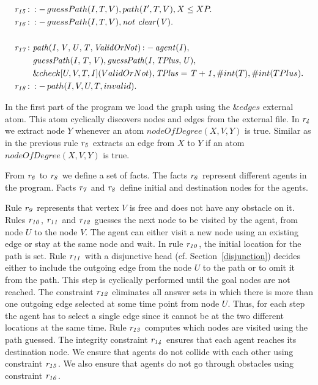\documentclass[a4paper, titlepage]{article}
\newcommand{\ext}[3]{\ensuremath{\&{#1}[#2](#3)}}
\DeclareMathOperator{\leftimpl}{:-}
\newcommand{\row}[1]{%
  \ensuremath{\it \color{black} #1 \color{black}}%
}
\begin{document}
\begin{exmp}
\begin{align*}
\row{r_{15}} \colon &  \leftimpl guessPath(I, T, V), 
path(I^{\prime},T,V), X \leq XP. \\
\row{r_{16}} \colon &  \leftimpl guessPath(I,T,V), \mathit{not} \  
\mathit{clear(V).}\\
\\
\row{r_{17}} \colon &  \mathit{path(I,V,U,T,ValidOrNot)} 
\leftimpl \mathit{agent(I)}, \\ & \mathit{guessPath(I, T, 
V)}, \mathit{guessPath(I, TPlus, U)}, \\ & \ext{check}{U, 
V, T, I}{ValidOrNot}, \mathit{TPlus=T+1}, \#int(T), 
\#int(TPlus).  \\
\row{r_{18}} \colon & \leftimpl path(I, V, U, T, invalid). 
\end{align*}
\end{exmp}


In the first part of the program we load the graph using 
the $\&edges$ external atom. This atom cyclically discovers 
nodes and edges from the external file. In $\row{r_4}$ we 
extract node $Y$ whenever an atom $\mathit{nodeOfDegree(X, 
V, Y)}$ is true. Similar as in the previous rule $\row{r_5}$ extracts an edge from $X$ to $Y$ if an atom 
$\mathit{nodeOfDegree(X, V,Y)}$ is true. 

From $\row{r_6}$ to $\row{r_8}$ we define a set of facts. 
The facts $\row{r_6}$ represent different agents in the program. 
Facts $\row{r_7}$ and $\row{r_8}$ define initial and 
destination nodes for the agents.  

Rule $\row{r_9}$ 
represents that vertex $V$ is free and does not have any 
obstacle on it. Rules $\row{r_{10}}$, $\row{r_{11}}$ and 
$\row{r_{12}}$ guesses the next node to be visited by the agent, from 
node $U$ to the node $V$. The agent can either visit a new node 
using an existing edge or stay at the same node and wait. 
In rule $\row{r_{10}}$, the initial location for the path is set. Rule $\row{r_{11}}$ 
with a disjunctive head (cf. Section~\ref{disjunction}) decides either to include the outgoing edge 
from the node $U$ to the path or to omit it from the path. 
This step is cyclically performed until the goal nodes are not 
reached. The constraint $\row{r_{12}}$ eliminates all answer sets in which there is more than one outgoing edge 
selected at some time point from node $U$. Thus, for each step 
the agent has to select a single edge since it cannot be at the 
two different locations at the same time. Rule $\row{\row{r_{13}}}$ computes which nodes are visited using the path 
guessed. The integrity constraint $\row{r_{14}}$ ensures that 
each agent reaches its destination node. We ensure that 
agents do not collide with each other using constraint 
$\row{r_{15}}$. We also ensure that agents do not go through 
obstacles using constraint $\row{r_{16}}$. 
\end{document}
